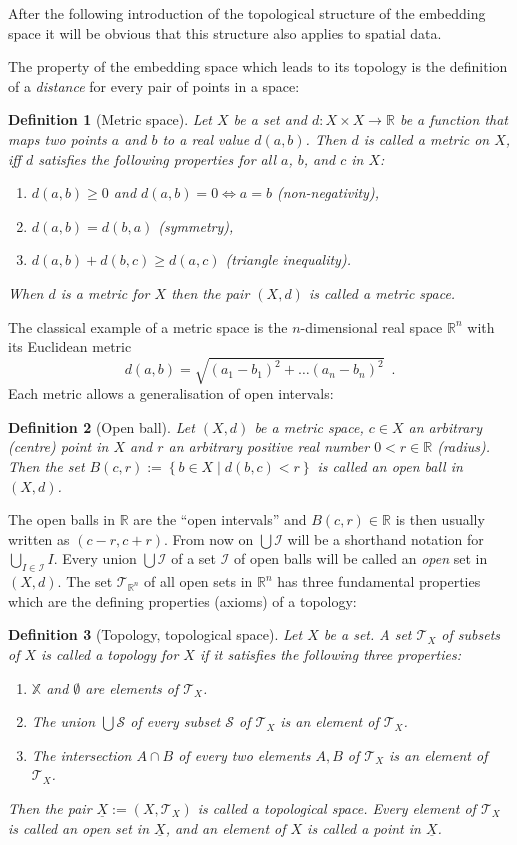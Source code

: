 \documentclass[5p]{elsarticle}
\newtheorem{dfn}{Definition}
\newcommand{\mathpset}[2]{\left\{#1\mid #2\right\}}
\newcommand{\qq}[1]{``#1''}
\begin{document}
After the following introduction of the topological structure of the embedding space 
it will be obvious that this structure also applies to spatial data. 

The property of the embedding space which leads to its topology is the 
definition of a \emph{distance} for every pair of points in a space:
\begin{dfn}[Metric space]
Let $X$ be a set and $d:X\times X\to \mathbb{R}$ be a function that maps 
two points $a$ and $b$ to a real value $d(a,b)$. Then $d$ is called a 
\emph{metric} on $X$, iff $d$ satisfies the following properties for all 
$a$, $b$, and $c$ in $X$:
\begin{enumerate}
\item $d(a,b)\ge 0$ and $d(a,b)= 0 \Leftrightarrow a=b$ (non-negativity),
\item $d(a,b)= d(b,a)$ (symmetry),
\item $d(a,b)+d(b,c) \ge d(a,c)$ (triangle inequality).
\end{enumerate}
When $d$ is a metric for $X$ then the pair $(X,d)$ is called a \emph{metric space}.
\end{dfn}
The classical example of a metric space is the 
$n$-di\-men\-sio\-nal real space $\mathbb{R}^n$ with its Euclidean metric 
$$
  d(a,b) = \sqrt{(a_1 - b_1)^2 + \dotsc (a_n - b_n)^2}\enspace.
$$
Each metric allows a generalisation of open intervals: 
\begin{dfn}[Open ball]
Let $(X,d)$ be a metric space, $c\in X$ an arbitrary (centre) point in $X$ and 
$r$ an arbitrary positive real number $0 < r\in \mathbb{R}$ (radius).  
Then the set $B(c,r) := \mathpset{b\in X}{d(b,c)<r}$ is called an \emph{open ball} 
in $(X,d)$.
\end{dfn}
The open balls in $\mathbb{R}$ are the \qq{open intervals} and 
$B(c,r) \in \mathbb{R}$ is then usually written as $(c-r,c+r)$. 
From now on $\bigcup\mathcal{I}$ will be a shorthand notation for $\bigcup_{I\in\mathcal{I}}I$. 
Every union $\bigcup\mathcal{I}$ of a set $\mathcal{I}$ of open balls will be called an 
\emph{open} set in $(X,d)$. 
The set $\mathcal{T}_{\mathbb{R}^n}$ of all open sets in $\mathbb{R}^n$ has three fundamental 
properties which are the defining properties (axioms) of a topology:
\begin{dfn}[Topology, topological space]
Let $X$ be a set. A set $\mathcal{T}_X$ of subsets of $X$ is called a \emph{topology} 
for $X$ if it satisfies the following three properties:
\begin{enumerate}
\item $\mathbb{X}$ and $\emptyset$ are elements of $\mathcal{T}_X$.
\item The union $\bigcup\mathcal{S}$ of every subset $\mathcal{S}$ of $\mathcal{T}_X$ is an 
      element of $\mathcal{T}_X$.
\item The intersection $A\cap B$ of every two elements $A,B$ of $\mathcal{T}_X$ is an 
      element of $\mathcal{T}_X$.
\end{enumerate}
Then the pair $\underline{X} := (X,\mathcal{T}_X)$ is called a \emph{topological space}.
Every element of $\mathcal{T}_X$ is called an \emph{open set} in $\underline{X}$, and 
an element of $X$ is called a \emph{point} in $\underline{X}$.
\end{dfn}
\end{document}
